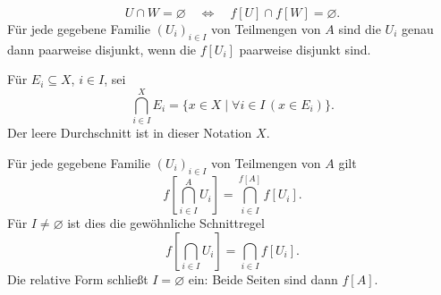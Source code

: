 \begin{theorem}
\label{b06guide:thm:disjoint}
\[
 U\cap W=\varnothing
 \quad\Longleftrightarrow\quad
 f[U]\cap f[W]=\varnothing.
\]
Für jede gegebene Familie $(U_i)_{i\in I}$ von Teilmengen von $A$
sind die $U_i$ genau dann paarweise disjunkt,
wenn die $f[U_i]$ paarweise disjunkt sind.
\end{theorem}

\begin{definition}
Für $E_i\subseteq X$, $i\in I$, sei
\[
 \bigcap_{i\in I}^{X}E_i
    =\{x\in X\mid\forall i\in I\,(x\in E_i)\}.
\]
Der leere Durchschnitt ist in dieser Notation $X$.
\end{definition}

\begin{theorem}
\label{b06guide:thm:intersections}
\label{b06guide:thm:relativeintersection}
Für jede gegebene Familie $(U_i)_{i\in I}$ von Teilmengen von $A$ gilt
\[
 f\left[\bigcap_{i\in I}^{A}U_i\right]
   =\bigcap_{i\in I}^{f[A]}f[U_i].
\]
Für $I\ne\varnothing$ ist dies die gewöhnliche Schnittregel
\[
 f\left[\bigcap_{i\in I}U_i\right]
    =\bigcap_{i\in I}f[U_i].
\]
Die relative Form schließt $I=\varnothing$ ein:
Beide Seiten sind dann $f[A]$.
\end{theorem}